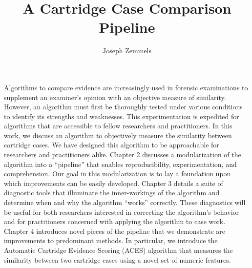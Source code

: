 \documentclass[11pt,]{isuthesis}
\title{A Cartridge Case Comparison Pipeline}
\author{Joseph Zemmels}
\date{}
\begin{document}
\maketitle


\cleardoublepage {}


{
\hypersetup{linkcolor=black}
\vspace{-2cm}
\setcounter{tocdepth}{2}
\tableofcontents
}

\cleardoublepage {} {}
\listoftables
\cleardoublepage {} {}
\listoffigures


\cleardoublepage {}



Algorithms to compare evidence are increasingly used in forensic examinations to supplement an examiner's opinion with an objective measure of similarity. However, an algorithm must first be thoroughly tested under various conditions to identify its strengths and weaknesses. This experimentation is expedited for algorithms that are accessible to fellow researchers and practitioners. In this work, we discuss an algorithm to objectively measure the similarity between cartridge cases. We have designed this algorithm to be approachable for researchers and practitioners alike. Chapter 2 discusses a modularization of the algorithm into a ``pipeline'' that enables reproducibility, experimentation, and comprehension. Our goal in this modularization is to lay a foundation upon which improvements can be easily developed. Chapter 3 details a suite of diagnostic tools that illuminate the inner-workings of the algorithm and determine when and why the algorithm ``works'' correctly. These diagnostics will be useful for both researchers interested in correcting the algorithm's behavior and for practitioners concerned with applying the algorithm to case work. Chapter 4 introduces novel pieces of the pipeline that we demonstrate are improvements to predominant methods. In particular, we introduce the Automatic Cartridge Evidence Scoring (ACES) algorithm that measures the similarity between two cartridge cases using a novel set of numeric features.
\end{document}
